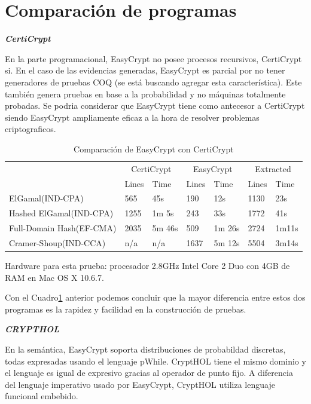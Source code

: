 \documentclass[runningheads,a4paper]{llncs}
\begin{document}
\section{Comparación de programas}
\centerline{\textbf{{\emph{CertiCrypt}}}}
En la parte programacional, EasyCrypt no posee procesos recursivos, CertiCrypt\cite{link3} si. En el caso de las evidencias generadas, EasyCrypt es parcial por no tener generadores de pruebas COQ (se está buscando agregar esta característica). Este también genera pruebas en base a la probabilidad y no máquinas totalmente probadas. Se podria considerar que EasyCrypt tiene como antecesor a CertiCrypt siendo EasyCrypt ampliamente eficaz a la hora de resolver problemas criptograficos.

\begin{table}
  \caption{Comparación de EasyCrypt con CertiCrypt}
  \label{tab:simple1}
  \centering
  \begin{tabular}{ |p{3.5cm}|p{1cm}|p{1.5cm}|p{1cm}|p{1.5cm}|p{1cm}|p{1.5cm}|  }
 \hline
 & \multicolumn{2}{|c|}{CertiCrypt} & \multicolumn{2}{|c|}{EasyCrypt} & \multicolumn{2}{|c|}{Extracted} \\\cline{2-7}

 &Lines&Time&Lines&Time&Lines&Time\\\cline{2-7}
 \hline
 ElGamal(IND-CPA) & 565 & 45s & 190 & 12s & 1130 & 23s\\
 Hashed ElGamal(IND-CPA) & 1255  & 1m 5s & 243  & 33s & 1772 & 41s\\
 Full-Domain Hash(EF-CMA) & 2035 & 5m 46s&  509 & 1m 26s & 2724 & 1m11s\\
 Cramer-Shoup(IND-CCA) & n/a & n/a & 1637 & 5m 12s & 5504 & 3m14s\\
 \hline
\end{tabular}
\end{table}

Hardware para esta prueba: procesador 2.8GHz Intel Core 2 Duo con 4GB de RAM en Mac OS X 10.6.7.\cite{article3}

Con el Cuadro\ref{tab:simple1} anterior podemos concluir que la mayor diferencia entre estos dos programas es la rapidez y facilidad en la construcción de pruebas.

\centerline{\textbf{{\emph{CRYPTHOL}}}}

En la semántica, EasyCrypt soporta distribuciones de probabildad discretas, todas expresadas usando el lenguaje pWhile. CryptHOL\cite{link4} tiene el mismo dominio y el lenguaje es igual de expresivo gracias al operador de punto fijo. A diferencia del lenguaje imperativo usado por EasyCrypt, CryptHOL utiliza lenguaje funcional embebido.
\end{document}
